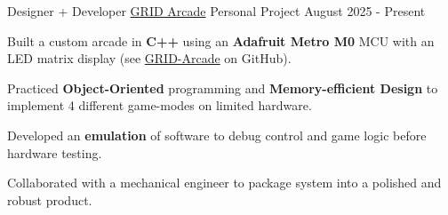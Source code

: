 \begin{cventries}
  \cventry
    {Designer + Developer}
    {\href{https://github.com/bryanluu/GRID-arcade}{GRID Arcade}}
    {Personal Project}
    {August 2025 - Present}
    {
      \begin{cvitems}
        \item Built a custom arcade in \textbf{C++} using an \textbf{Adafruit Metro M0} MCU  with an LED matrix display (see \href{https://github.com/bryanluu/GRID-Arcade}{GRID-Arcade} on GitHub).
        \item Practiced \textbf{Object-Oriented} programming and \textbf{Memory-efficient Design} to implement 4 different game-modes on limited hardware.
        \item Developed an \textbf{emulation} of software to debug control and game logic before hardware testing.
        \item Collaborated with a mechanical engineer to package system into a polished and robust product.
      \end{cvitems}
    }

\end{cventries}
